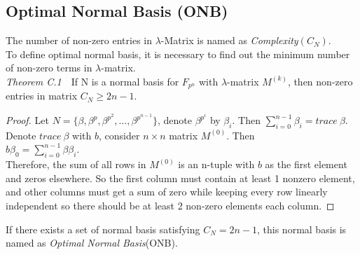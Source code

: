 \subsection{Optimal Normal Basis (ONB)}

The number of non-zero entries in $\lambda$-Matrix is named as  \emph{Complexity$(C_N)$}. \\
To define optimal normal basis, it is necessary to find out the minimum number
of non-zero terms in $\lambda$-matrix.\\
\textit{Theorem C.1}\ \ If N is a normal basis for $F_{p^n}$ with $\lambda$-matrix $M^{(k)}$, then non-zero entries in 
matrix $C_N\geq 2n-1$.\\
\begin{proof}
Let $N = \{\beta, \beta^p, \beta^{p^2},\dots, \beta^{p^{n-1}}\}$, denote $\beta^{p^i}$ by $\beta_i$. 
Then $\sum_{i=0}^{n-1} \beta_i = trace\ \beta$. \\
Denote $trace\ \beta$ with $b$, consider $n\times n$ matrix $M^{(0)}$. Then\\
$b\beta_0 = \sum_{i=0}^{n-1} \beta \beta_i$.\\
Therefore, the sum of all rows in $M^{(0)}$ is an n-tuple with $b$ as the first element and zeros elsewhere.
So the first column must contain at least 1 nonzero element, and other columns must get a sum of zero 
while keeping every row linearly independent so there should be at least 2 non-zero elements each column.
\end{proof}
If there exists a set of normal basis satisfying $C_N = 2n - 1$, this normal basis is named as
\emph{Optimal Normal Basis}(ONB).\\

